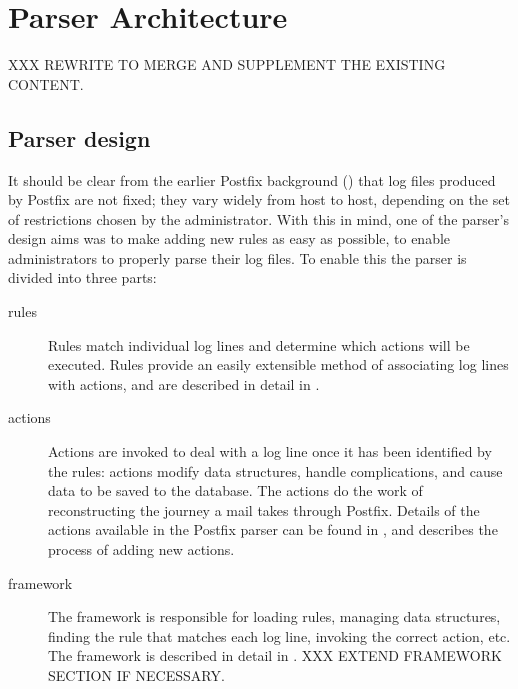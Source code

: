 \newpage{}

\section{Parser Architecture}

XXX REWRITE TO MERGE AND SUPPLEMENT THE EXISTING CONTENT\@.

\subsection{Parser design}

\label{parser design}

It should be clear from the earlier Postfix background () that log files produced by Postfix are not fixed; they vary
widely from host to host, depending on the set of restrictions chosen by
the administrator.  With this in mind, one of the parser's design aims was
to make adding new rules as easy as possible, to enable administrators to
properly parse their log files.  To enable this the parser is divided into
three parts:

\begin{description}

    \item [rules] Rules match individual log lines and determine which
        actions will be executed.  Rules provide an easily extensible
        method of associating log lines with actions, and are described in
        detail in .

    \item [actions] Actions are invoked to deal with a log line once it has
        been identified by the rules: actions modify data structures,
        handle complications, and cause data to be saved to the database.
        The actions do the work of reconstructing the journey a mail takes
        through Postfix.  Details of the actions available in the Postfix
        parser can be found in , and
         describes the process of adding new
        actions.

    \item [framework] The framework is responsible for loading rules,
        managing data structures, finding the rule that matches each log
        line, invoking the correct action, etc\@.  The framework is
        described in detail in .  XXX EXTEND
        FRAMEWORK SECTION IF NECESSARY\@.

\end{description}

